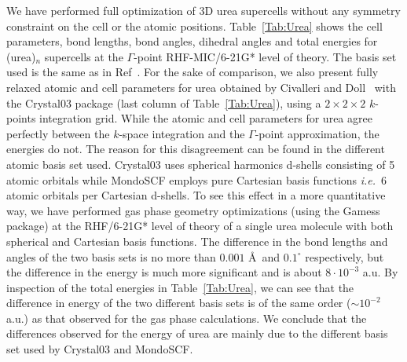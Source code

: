 \documentclass[prl,preprint,doublespace]{revtex4} %
\begin{document}
We have performed full optimization of 3D urea supercells 
without any symmetry constraint on the cell or the atomic positions.
Table~\ref{Tab:Urea} shows the cell parameters, bond lengths, 
bond angles, dihedral angles and total energies
for (urea)$_n$ supercells at the $\Gamma$-point RHF-MIC/6-21G* level of
theory. The basis set used is the same as in Ref~\cite{RDovesi90}.
For the sake of comparison, we also present fully relaxed atomic and cell parameters
for urea obtained by Civalleri and Doll~\cite{BCivalleri05} with the 
{\sc Crystal03} package (last column of Table~\ref{Tab:Urea}), 
using a $2\times 2\times 2$ $k$-points integration grid.
While the atomic and cell parameters for urea agree perfectly between the $k$-space integration
and the $\Gamma$-point approximation, the energies do not.
The reason for this disagreement can be found in the different atomic basis set used.
{\sc Crystal03} uses spherical harmonics d-shells consisting of 5 atomic orbitals 
while {\sc MondoSCF} employs pure Cartesian basis functions {\em i.e.}~6 atomic orbitals 
per Cartesian d-shells.
To see this effect in a more quantitative way, we have performed gas phase geometry optimizations 
(using the {\sc Gamess}~\cite{gamess} package) at the RHF/6-21G* level of theory 
of a single urea molecule with both spherical and Cartesian basis functions.
The difference in the bond lengths and angles of the two basis sets 
is no more than $0.001$ \AA~and $0.1^\circ$ respectively, but the
difference in the energy is much more significant and is about $8\cdot 10^{-3}$ a.u.
By inspection of the total energies in Table~\ref{Tab:Urea}, we can see that the difference
in energy of the two different basis sets is of the same order ($\sim 10^{-2}$ a.u.) 
as that observed
for the gas phase calculations. We conclude that the differences observed for the energy
of urea are mainly due to the different basis set used by {\sc Crystal03} and 
{\sc MondoSCF}.
\end{document}
